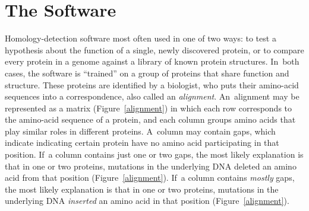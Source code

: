 \documentclass[preprint,nonatbib,blockstyle,nocopyrightspace,times]{sigplanconf}
\newcommand\figref[1]{Figure~\ref{#1}}
\begin{document}




\section{The Software}


Homology-detection software most often used in one of two ways:
to test a hypothesis about 
the function of a single, newly discovered protein, or 
to compare every protein in a genome against a library of known protein 
structures.
In~both cases, the software is ``trained'' 
on a group of proteins that share function and structure.
These proteins are identified by a biologist, who puts
their amino-acid sequences into a correspondence, also called an
\emph{alignment}.
An~alignment may be represented as a matrix
(Figure~\ref{alignment}) 
in which each row corresponds to the amino-acid sequence of a protein,
and each column groups amino acids that play similar roles in
different proteins.
A~column
may contain gaps, which indicate
indicating certain protein have no amino acid participating in that
position.
If~a column contains just one or two gaps, the most likely explanation
is that in one or two proteins, mutations in the underlying DNA
deleted an amino acid from that position (\figref{alignment}).
If~a column contains \emph{mostly} gaps, 
the most likely explanation
is that in one or two proteins, mutations in the underlying DNA
\emph{inserted} an amino acid in that position (\figref{alignment}).
\end{document}
